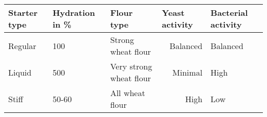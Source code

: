


\begin{tabular}{|l|l|l|r|l|}
\hline
\textbf{Starter type} & \textbf{Hydration in \%} & \textbf{Flour type}     & \multicolumn{1}{l|}{\textbf{Yeast activity}} & \textbf{Bacterial activity} \\ \hline
Regular               & 100                      & Strong wheat flour      & Balanced                                     & Balanced                    \\ \hline
Liquid                & 500                      & Very strong wheat flour & Minimal                                      & High                        \\ \hline
Stiff                 & 50-60                    & All wheat flour         & High                                         & Low                         \\ \hline
\end{tabular}

